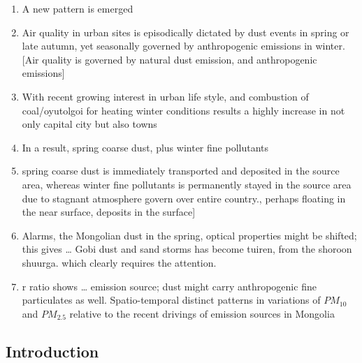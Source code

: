 \documentclass[
  11pt,
]{article}
\providecommand{\tightlist}{%
  \setlength{\itemsep}{0pt}\setlength{\parskip}{0pt}}
\begin{document}
\begin{enumerate}
\def\labelenumi{\arabic{enumi}.}
\tightlist
\item
  A new pattern is emerged
\item
  Air quality in urban sites is episodically dictated by dust events in
  spring or late autumn, yet seasonally governed by anthropogenic
  emissions in winter. {[}Air quality is governed by natural dust
  emission, and anthropogenic emissions{]}
\item
  With recent growing interest in urban life style, and combustion of
  coal/oyutolgoi for heating winter conditions results a highly increase
  in not only capital city but also towns
\item
  In a result, spring coarse dust, plus winter fine pollutants
\item
  spring coarse dust is immediately transported and deposited in the
  source area, whereas winter fine pollutants is permanently stayed in
  the source area due to stagnant atmosphere govern over entire
  country., perhaps floating in the near surface, deposits in the
  surface{]}
\item
  Alarms, the Mongolian dust in the spring, optical properties might be
  shifted; this gives \ldots{} Gobi dust and sand storms has become
  tuiren, from the shoroon shuurga. which clearly requires the
  attention.
\item
  r ratio shows \ldots{} emission source; dust might carry anthropogenic
  fine particulates as well. Spatio-temporal distinct patterns in
  variations of \(PM_{10}\) and \(PM_{2.5}\) relative to the recent
  drivings of emission sources in Mongolia \newpage
\end{enumerate}

\subsection{Introduction}\label{introduction}
\end{document}
